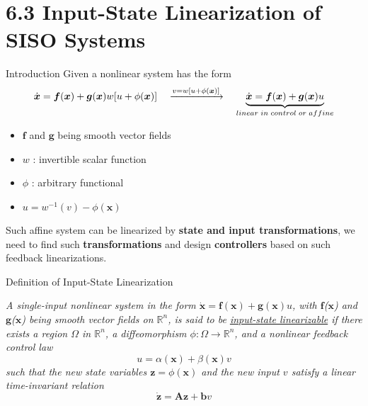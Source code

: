 \documentclass{beamer}
\renewcommand{\vec}[1]{\ensuremath{\boldsymbol{#1}}} %
\begin{document}
\section{6.3  Input-State Linearization of SISO Systems}

\begin{frame}{Introduction}
Given a nonlinear system has the form
$$
\dot{\vec{x}}=\vec{f}(\vec{x})+\vec{g}(\vec{x})w[u+\phi(\vec{x})] \quad \xrightarrow{v=w[u+\phi(\vec{x})]} \quad \underbrace{\dot{\vec{x}}=\vec{f}(\vec{x})+\vec{g}(\vec{x})u}_{\tiny linear~in~control~or ~affine}
$$
\vspace{-20pt}
\begin{itemize}
  \item \vec{f} and \vec{g} being smooth vector fields
  \item $w$ : invertible scalar function
  \item $\phi$ : arbitrary functional
  \item $u = w^{-1}(v)-\phi(\vec{x})$
\end{itemize}
Such affine system can be linearized by \textbf{state and input transformations}, we need to find such \textbf{transformations} and design \textbf{controllers} based on such feedback linearizations.
\end{frame}


\begin{frame}{Definition of Input-State Linearization}
    \begin{definition}[6.6]
    \textit{
    A single-input nonlinear system in the form $ \dot{\vec{x}} = \vec{f}(\vec{x}) + \vec{g}(\vec{x})u $, with \vec{f}(\vec{x}) and \vec{g}(\vec{x}) being smooth vector fields on $\mathbb{R}^{n}$, is said to be \underline{input-state linearizable} if there exists a {\color{red}region $\Omega$ in $\mathbb{R}^{n}$}, a {\color{red}diffeomorphism $ \phi : \Omega \rightarrow \mathbb{R}^{n} $}, and a {\color{red}nonlinear feedback control law}
    \begin{equation}\label{affine}
      u = \alpha(\vec{x})+\beta(\vec{x})v
    \end{equation}
    such that the new state variables $\vec{z}=\phi(\vec{x})$ and the new input $v$ satisfy a linear time-invariant relation
    \begin{equation}\label{linear-relation}
      \dot{\vec{z}} = \vec{A}\vec{z}+\vec{b}v
    \end{equation}
    }
    \end{definition}
\end{frame}
\end{document}
